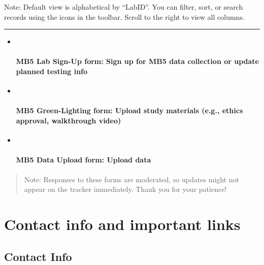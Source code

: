 \documentclass[
  letterpaper,
  DIV=11,
  numbers=noendperiod,
  oneside]{scrreprt}
\begin{document}

Note: Default view is alphabetical by ``LabID''. You can filter, sort,
or search records using the icons in the toolbar. Scroll to the right to
view all columns.

\begin{center}\rule{0.5\linewidth}{0.5pt}\end{center}

\begin{itemize}
\item ~
  \subsubsection{MB5 Lab Sign-Up form: Sign up for MB5 data collection
  or update planned testing
  info}\label{mb5-lab-sign-up-form-sign-up-for-mb5-data-collection-or-update-planned-testing-info}
\item ~
  \subsubsection{MB5 Green-Lighting form: Upload study materials (e.g.,
  ethics approval, walkthrough
  video)}\label{mb5-green-lighting-form-upload-study-materials-e.g.-ethics-approval-walkthrough-video}
\item ~
  \subsubsection{MB5 Data Upload form: Upload
  data}\label{mb5-data-upload-form-upload-data}
\end{itemize}

\begin{quote}
Note: Responses to these forms are moderated, so updates might not
appear on the tracker immediately. Thank you for your patience!
\end{quote}

\chapter{Contact info and important links}\label{sec-contactinfo}

\section{Contact Info}\label{contact-info}
\end{document}
